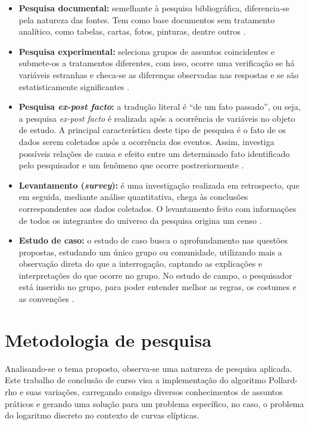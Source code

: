 \begin{itemize}
\begin{itemize}
	\item \textbf{Pesquisa documental:} semelhante à pesquisa bibliográfica, diferencia-se pela natureza das fontes. Tem como base documentos sem tratamento analítico, como tabelas, cartas, fotos, pinturas, dentre outros \cite{Gil:2008}.
	\item \textbf{Pesquisa experimental:} seleciona grupos de assuntos coincidentes e submete-os a tratamentos diferentes, com isso, ocorre uma verificação se há variáveis estranhas e checa-se as diferenças observadas nas respostas e se são estatisticamente significantes \cite{Tafner:2007}.
	\item \textbf{Pesquisa \textit{ex-post facto}:} a tradução literal é ``de um fato passado'', ou seja, a pesquisa \textit{ex-post facto} é realizada após a ocorrência de variáveis no objeto de estudo. A principal característica deste tipo de pesquisa é o fato de os dados serem coletados após a ocorrência dos eventos. Assim, investiga possíveis relações de causa e efeito entre um determinado fato identificado pelo pesquisador e um fenômeno que ocorre postreriormente \cite{Gil:2008}.
	\item \textbf{Levantamento (\textit{survey}):} é uma investigação realizada em retrospecto, que em seguida, mediante análise quantitativa, chega às conclusões correspondentes aos dados coletados. O levantamento feito com informações de todos os integrantes do universo da pesquisa origina um censo \cite{Travassos:2002}.
	\item \textbf{Estudo de caso:} o estudo de caso busca o aprofundamento nas questões propostas, estudando um único grupo ou comunidade, utilizando mais a observação direta do que a interrogação, captando as explicações e interpretações do que ocorre no grupo. No estudo de campo, o pesquisador está inserido no grupo, para poder entender melhor as regras, os costumes e as convenções \cite{Travassos:2002}.
	\end{itemize}
\end{itemize}

%
%
\section{Metodologia de pesquisa}
Analisando-se o tema proposto, observa-se uma natureza de pesquisa aplicada. Este trabalho de conclusão de curso visa a implementação do algoritmo Pollard-rho e suas variações, carregando consigo diversos conhecimentos de assuntos práticos e gerando uma solução para um problema específico, no caso, o problema do logaritmo discreto no contexto de curvas elípticas.

